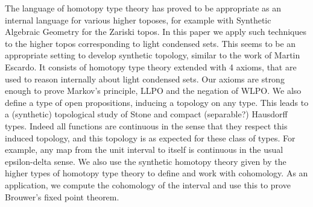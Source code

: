 The language of homotopy type theory has proved to be appropriate as an internal language for various higher toposes, for example with Synthetic Algebraic Geometry for the Zariski topos.
In this paper we apply such techniques to the higher topos corresponding to light condensed sets.
This seems to be an appropriate setting to develop synthetic topology, similar to the work of Martin Escardo.
It consists of homotopy type theory extended with 4 axioms, that are used to reason internally about light condensed sets.
Our axioms are strong enough to prove Markov's principle, LLPO and the negation of WLPO. 
We also define a type of open propositions, inducing a topology on any type. 
This leads to a (synthetic) topological study of Stone and compact (separable?) Hausdorff types. 
Indeed all functions are continuous in the sense that they respect this induced topology, and this topology is as expected for these class of types.
For example, any map from the unit interval to itself is continuous in the usual epsilon-delta sense.
We also use the synthetic homotopy theory given by the higher types of homotopy type theory to define and work with cohomology.
As an application, we compute the cohomology of the interval and use this to prove Brouwer's fixed point theorem. 
